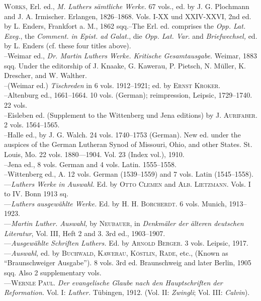 \textsc{Works,} Erl. ed., \textit{M. Luthers sämtliche Werke.} 67 vols., ed. by J. G. Plochmann
and J. A. Irmischer. Erlangen, 1826--1868. Vols. I-XX und XXIV-XXVI, 2nd ed. by
L. Enders, Frankfort a. M., 1862 sqq.--The Erl. ed.
comprises the \textit{Opp. Lat. Exeg.}, the \textit{Comment. in Epist. ad Galat.}, die \textit{Opp.
Lat. Var.} and \textit{Briefwechsel,} ed. by L. Enders (cf. these four titles above). \\
--Weimar ed., \textit{Dr. Martin Luthers Werke. Kritische Gesamtausgabe.} Weimar,
1883 sqq. Under the editorship of J. Knaake, G. Kawerau, P. Pietsch,
N. Müller, K. Drescher, and W. Walther. \\
--(Weimar ed.) \textit{Tischreden} in 6 vols. 1912--1921; ed. by \textsc{Ernst Kroker.} \\
--Altenburg ed., 1661--1664. 10 vols. (German); reimpression, Leipsic,
1729--1740. 22 vols. \\
--Eisleben ed. (Supplement to the Wittenberg und Jena editions) by \textsc{J.
Aurifaber.} 2 vols. 1564--1565. \\
--Halle ed., by J. G. Walch. 24 vols. 1740--1753 (German). New ed.
under the auspices of the German Lutheran Synod of Missouri, Ohio, and
other States. St. Louis, Mo. 22 vols. 1880---1904. Vol. 23 (Index vol.),
1910. \\
--Jena ed., 8 vols. German and 4 vols. Latin. 1555--1558. \\
--Wittenberg ed., A. 12 vols. German (1539--1559) and 7 vols. Latin
(1545--1558). \\
---\textit{Luthers Werke in Auswahl.} Ed. by \textsc{Otto Clemen} and \textsc{Alb. Lietzmann.}
Vols. I to IV. Bonn 1913 sq. \\
---\textit{Luthers ausgewählte Werke.} Ed. by \textsc{H. H. Borcherdt.} 6 vols. Munich,
1913--1923. \\
---\textit{Martin Luther. Auswahl,} by \textsc{Neubauer}, in \textit{Denkmäler der älteren
deutschen Literatur}, Vol. III, Heft 2 and 3. 3rd ed., 1903--1907. \\
---\textit{Ausgewählte Schriften Luthers.} Ed. by \textsc{Arnold Berger.} 3 vols. Leipsic,
1917. \\
---\textit{Auswahl,} ed. by \textsc{Buchwald, Kawerau, Köstlin, Rade,} etc., (Known
as “Braunschweiger Ausgabe”). 8 vols. 3rd ed. Braunschweig and later
Berlin, 1905 sqq. Also 2 supplementary vols. \\
---\textsc{Wernle Paul.} \textit{Der evangelische Glaube nach den Hauptschriften der Reformation.}
Vol. I: \textit{Luther.} Tübingen, 1912. (Vol. II: \textit{Zwingli}; Vol. III:
\textit{Calvin}).

